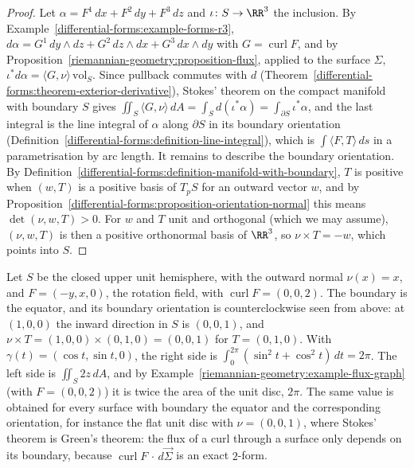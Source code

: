 \begin{proof}
Let $\alpha = F^1\,dx + F^2\,dy + F^3\,dz$ and $\iota \colon S \to \RR^3$ the inclusion. By Example~\ref{differential-forms:example-forms-r3},
$d\alpha = G^1\,dy \wedge dz + G^2\,dz \wedge dx + G^3\,dx \wedge dy$ with $G = \operatorname{curl}F$, and by Proposition~\ref{riemannian-geometry:proposition-flux}, applied to the surface $\Sigma$,
$\iota^*d\alpha = \langle G, \nu\rangle\,\mathrm{vol}_S$. Since pullback commutes with $d$ (Theorem~\ref{differential-forms:theorem-exterior-derivative}), Stokes' theorem on the compact manifold with
boundary $S$ gives $\iint_S\langle G, \nu\rangle\,dA = \int_Sd(\iota^*\alpha) = \int_{\partial S}\iota^*\alpha$, and the last integral is the line integral of $\alpha$ along $\partial S$ in its boundary orientation
(Definition~\ref{differential-forms:definition-line-integral}), which is $\int\langle F, T\rangle\,ds$ in a parametrisation by arc length. It remains to describe the boundary orientation. By
Definition~\ref{differential-forms:definition-manifold-with-boundary}, $T$ is positive when $(w, T)$ is a positive basis of $T_pS$ for an outward vector $w$, and by
Proposition~\ref{differential-forms:proposition-orientation-normal} this means $\det(\nu, w, T) > 0$. For $w$ and $T$ unit and orthogonal (which we may assume), $(\nu, w, T)$ is then a positive orthonormal basis of
$\RR^3$, so $\nu \times T = -w$, which points into $S$.
\end{proof}

\begin{example}\label{riemannian-geometry:example-stokes-hemisphere}
Let $S$ be the closed upper unit hemisphere, with the outward normal $\nu(x) = x$, and $F = (-y, x, 0)$, the rotation field, with $\operatorname{curl}F = (0, 0, 2)$. The boundary is the equator, and its
boundary orientation is counterclockwise seen from above: at $(1, 0, 0)$ the inward direction in $S$ is $(0, 0, 1)$, and $\nu \times T = (1, 0, 0) \times (0, 1, 0) = (0, 0, 1)$ for $T = (0, 1, 0)$. With
$\gamma(t) = (\cos t, \sin t, 0)$, the right side is $\int_0^{2\pi}(\sin^2t + \cos^2t)\,dt = 2\pi$. The left side is $\iint_S2z\,dA$, and by Example~\ref{riemannian-geometry:example-flux-graph} (with
$F = (0, 0, 2)$) it is twice the area of the unit disc, $2\pi$. The same value is obtained for every surface with boundary the equator and the corresponding orientation, for instance the flat unit disc
with $\nu = (0, 0, 1)$, where Stokes' theorem is Green's theorem: the flux of a curl through a surface only depends on its boundary, because $\operatorname{curl}F\,\cdot\,d\vec\Sigma$ is an exact $2$-form.
\end{example}

